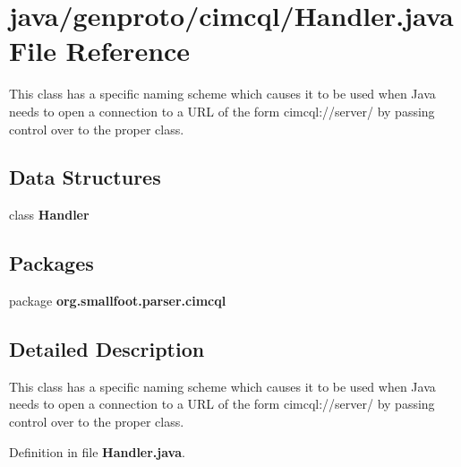 \section{java/genproto/cimcql/\+Handler.java File Reference}
\label{cimcql_2Handler_8java}


This class has a specific naming scheme which causes it to be used when Java needs to open a connection to a U\+R\+L of the form cimcql\+://server/ by passing control over to the proper class.  


\subsection*{Data Structures}
\begin{DoxyCompactItemize}
\item 
class {\bf Handler}
\end{DoxyCompactItemize}
\subsection*{Packages}
\begin{DoxyCompactItemize}
\item 
package {\bf org.\+smallfoot.\+parser.\+cimcql}
\end{DoxyCompactItemize}


\subsection{Detailed Description}
This class has a specific naming scheme which causes it to be used when Java needs to open a connection to a U\+R\+L of the form cimcql\+://server/ by passing control over to the proper class. 



Definition in file {\bf Handler.\+java}.

